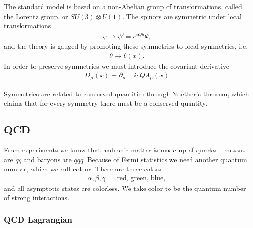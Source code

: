 \documentclass[11pt]{article}
\begin{document}
\begin{multicols}{2}
\begin{flushleft}
The standard model is based on a non-Abelian group of transformations, called the Lorentz group, or $SU(3) \otimes U(1)$. The spinors are symmetric under local transformations
\begin{align*}
\psi \rightarrow \psi'=e^{iQ\theta} \Psi,
\end{align*}
and the theory is gauged by promoting these symmetries to local symmetries, i.e.
\begin{align*}
\theta \rightarrow \theta (x).
\end{align*}
In order to preserve symmetries we must introduce the covariant derivative
\begin{align}
D_{\mu}(x) = \partial_{\mu} - ieQA_{\mu}(x)
\end{align}
\end{flushleft}

\begin{flushleft}
Symmetries are related to conserved quantities through Noether's theorem, which claims that for every symmetry there must be a conserved quantity.
\end{flushleft}



\subsection{QCD}
\begin{flushleft}
From experiments we know that hadronic matter is made up of quarks -- mesons are $q \bar{q}$ and baryons are $qqq$. Because of Fermi statistics we need another quantum number, which we call colour. There are three colors
\begin{align*}
\alpha, \beta, \gamma = \text{ red, green, blue},
\end{align*}
and all asymptotic states are colorless. We take color to be the quantum number of strong interactions.
\end{flushleft}

\subsubsection*{QCD Lagrangian}


\end{multicols}
\end{document}
